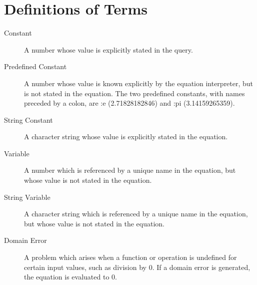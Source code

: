 
\section{Definitions of Terms}
\label{glossary}

\begin{description}
\item[Constant]
  
  A number whose value is explicitly stated in the query.

\item[Predefined Constant]
  
  A number whose value is known explicitly by the equation
  interpreter, but is not stated in the equation. The two predefined
  constants, with names preceded by a colon, are :e (2.71828182846)
  and :pi (3.14159265359).

\item[String Constant]
  
  A character string whose value is explicitly stated in the equation.

\item[Variable]
  
  A number which is referenced by a unique name in the equation, but
  whose value is not stated in the equation.

\item[String Variable]
  
  A character string which is referenced by a unique name in the
  equation, but whose value is not stated in the equation.

\item[Domain Error]
  
  A problem which arises when a function or operation is undefined for
  certain input values, such as division by 0. If a domain error is
  generated, the equation is evaluated to 0.
\end{description}


